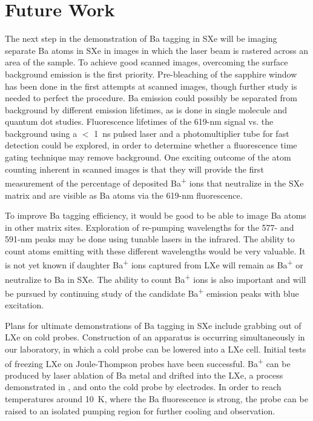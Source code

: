 \section{Future Work}
\label{sec:future}

The next step in the demonstration of Ba tagging in SXe will be imaging separate Ba atoms in SXe in images in which the laser beam is rastered across an area of the sample.  To achieve good scanned images, overcoming the surface background emission is the first priority.  Pre-bleaching of the sapphire window has been done in the first attempts at scanned images, though further study is needed to perfect the procedure.  Ba emission could possibly be separated from background by different emission lifetimes, as is done in single molecule and quantum dot studies.  Fluorescence lifetimes of the 619-nm signal vs. the background using a $<$ 1~ns pulsed laser and a photomultiplier tube for fast detection could be explored, in order to determine whether a fluorescence time gating technique may remove background.  One exciting outcome of the atom counting inherent in scanned images is that they will provide the first measurement of the percentage of deposited Ba\textsuperscript{+} ions that neutralize in the SXe matrix and are visible as Ba atoms via the 619-nm fluorescence.

To improve Ba tagging efficiency, it would be good to be able to image Ba atoms in other matrix sites.  Exploration of re-pumping wavelengths for the 577- and 591-nm peaks may be done using tunable lasers in the infrared.  The ability to count atoms emitting with these different wavelengths would be very valuable.  It is not yet known if daughter Ba\textsuperscript{+} ions captured from LXe will remain as Ba\textsuperscript{+} or neutralize to Ba in SXe.  The ability to count Ba\textsuperscript{+} ions is also important and will be pursued by continuing study of the candidate Ba\textsuperscript{+} emission peaks with blue excitation.

Plans for ultimate demonstrations of Ba tagging in SXe include grabbing out of LXe on cold probes.  Construction of an apparatus is occurring simultaneously in our laboratory, in which a cold probe can be lowered into a LXe cell.  Initial tests of freezing LXe on Joule-Thompson probes have been successful.  Ba\textsuperscript{+} can be produced by laser ablation of Ba metal and drifted into the LXe, a process demonstrated in \cite{Kendy}, and onto the cold probe by electrodes.  In order to reach temperatures around 10~K, where the Ba fluorescence is strong, the probe can be raised to an isolated pumping region for further cooling and observation.

